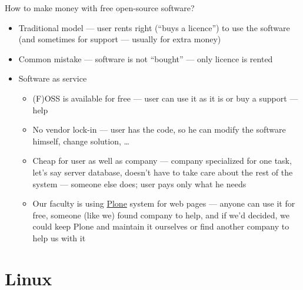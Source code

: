 \documentclass[compress, ucs, xelatex, 11pt, xcolor=svgnames,
  hyperref={
    bookmarks=true,
    unicode=true,
    colorlinks=true,
    pdftitle={Linux, command line and MetaCentrum},
    plainpages=false,
    pdfauthor={Vojtech Zeisek},
    pdfsubject={Course about use of Linux command line, writing shell scripts and using MetaCentrum of CESNET},
    pdfcreator={XeLaTeX, http://www.xelatex.org/},
    pdfkeywords={Linux, GNU, BASH, shell, command line, MetaCentrum},
    linkcolor=Sienna,
    anchorcolor=black,
    citecolor=green,
    filecolor=magenta,
    menucolor=Sienna,
    urlcolor=cyan,
    pdftex},
  url={hyphens, lowtilde} %
  ]{beamer}
\begin{document}
\begin{frame}{How to make money with free open-source software?}
\begin{itemize}
  \item Traditional model --- user rents right (``buys a licence'') to use the software (and sometimes for support --- usually for extra money)
  \item Common mistake --- software is not ``bought'' --- only licence is rented
  \item Software as service
  \begin{itemize}
    \item (F)OSS is available for free --- user can use it as it is or buy a support --- help
    \item No vendor lock-in --- user has the code, so he can modify the software himself, change solution, \ldots
    \item Cheap for user as well as company --- company specialized for one task, let's say server database, doesn't have to take care about the rest of the system --- someone else does; user pays only what he needs
    \item Our faculty is using \href{https://plone.org/}{Plone} system for web pages --- anyone can use it for free, someone (like we) found company to help, and if we'd decided, we  could keep Plone and maintain it ourselves or find another company to help us with it
  \end{itemize}
\end{itemize}
\end{frame}

\section{Linux}
\end{document}
